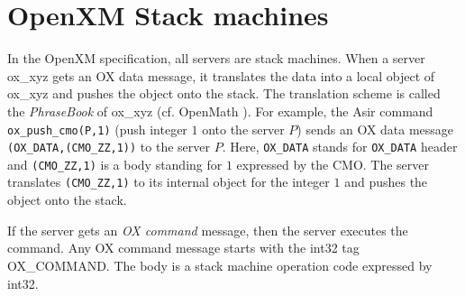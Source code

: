
\section{OpenXM Stack machines}\label{sec:ox-stackmachines}

In the OpenXM specification, all servers are stack machines.
When a server ox\_xyz gets an OX data message,
it translates the data into a local object of ox\_xyz
and pushes the object onto the stack.
The translation scheme 
is called the {\it PhraseBook} of ox\_xyz (cf. OpenMath \cite{OpenMath}).
For example, the Asir command {\tt ox\_push\_cmo(P,1)}
(push integer $1$ onto the server $P$)
sends an OX data message
{\tt (OX\_DATA,(CMO\_ZZ,1))} to the server $P$.
Here,
{\tt OX\_DATA} stands for {\tt OX\_DATA} header and 
{\tt (CMO\_ZZ,1)} is a body standing for $1$ expressed 
by the CMO.
The server translates {\tt (CMO\_ZZ,1)} to its internal object for
the integer  $1$
and pushes the object onto the stack.

If the server gets an {\it OX command} message, then the server 
executes the command.
Any OX command message starts with the int32 tag OX\_COMMAND.
The body is a stack machine operation code expressed by int32.

